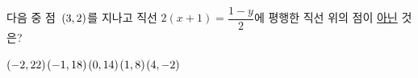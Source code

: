다음 중 점~$(3{,}\mkern3mu\mathopen{}2)$를 지나고 직선 $2(x+1)=\dfrac{1-y}{2}$에 평행한 직선 위의 점이 \underline{아닌} 것은?
\begin{choices32}{$(-2{,}\mkern3mu\mathopen{}22)$}{$(-1{,}\mkern3mu\mathopen{}18)$}{$(0{,}\mkern3mu\mathopen{}14)$}{$(1{,}\mkern3mu\mathopen{}8)$}{$(4{,}\mkern3mu\mathopen{}-2)$}\end{choices32}
